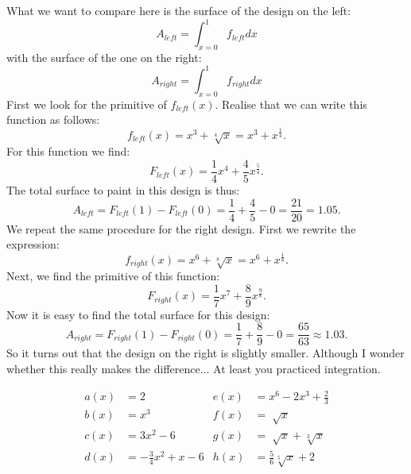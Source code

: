 \documentclass[a4paper]{report}
\begin{document}
\begin{Answer}[ref=ex0202]
\noindent What we want to compare here is the surface of the design on the left:
\begin{equation*}
A_{left} = \int_{x=0}^1 f_{left}dx
\end{equation*}
with the surface of the one on the right:
\begin{equation*}
A_{right} = \int_{x=0}^1 f_{right}dx
\end{equation*}
First we look for the primitive of $f_{left}(x)$. Realise that we can write this function as follows:
\begin{equation*}
f_{left}(x) = x^3 + \sqrt[4]{x} = x^3 + x^{\frac{1}{4}}.
\end{equation*}
For this function we find:
\begin{equation*}
F_{left}(x) = \frac{1}{4} x^4 + \frac{4}{5}x^{\frac{5}{4}}.
\end{equation*}
The total surface to paint in this design is thus:
\begin{equation*}
A_{left} = F_{left}(1) - F_{left}(0) = \frac{1}{4} + \frac{4}{5} - 0 = \frac{21}{20} = 1.05.
\end{equation*}
We repeat the same procedure for the right design. First we rewrite the expression:
\begin{equation*}
f_{right}(x) = x^6 + \sqrt[8]{x} = x^6 + x^{\frac{1}{8}}.
\end{equation*}
Next, we find the primitive of this function:
\begin{equation*}
F_{right}(x) = \frac{1}{7}x^7 + \frac{8}{9}x^{\frac{9}{8}}.
\end{equation*}
Now it is easy to find the total surface for this design:
\begin{equation*}
A_{right} = F_{right}(1) - F_{right}(0)  = \frac{1}{7} + \frac{8}{9} - 0 = \frac{65}{63} \approx 1.03.
\end{equation*}
So it turns out that the design on the right is slightly smaller. Although I wonder whether this really makes the difference... At least you practiced integration.
\end{Answer}

\begin{Exercise}[title=Find the primitives of the following functions, difficulty=2,label=ex3]
\begin{align*}
a(x) & =2 & e(x) &= x^6-2x^3+\frac{2}{3}\\ 
b(x) & =x^3 & f(x) &= \sqrt[]x\\  
c(x) &=3x^2-6 & g(x) &=\sqrt[]x+ \sqrt[3]x\\
d(x) &= -\frac{3}{4}x^2+x-6 &  h(x) &=\frac{5}{6}\sqrt[5]{x}+2\\  
\end{align*}
\end{Exercise}
\end{document}
